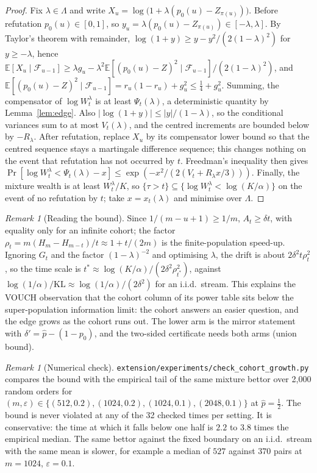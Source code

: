 \documentclass[11pt]{article}
\theoremstyle{definition}
\theoremstyle{remark}
\newtheorem{remark}[theorem]{Remark}
\newcommand{\eps}{\varepsilon}
\newcommand{\E}{\mathbb{E}}
\newcommand{\F}{\mathcal{F}}
\begin{document}
\begin{proof}
Fix $\lambda\in\Lambda$ and write
$X_u=\log\bigl(1+\lambda(p_0(u)-Z_{\pi(u)})\bigr)$. Before refutation
$p_0(u)\in[0,1]$, so $y_u=\lambda(p_0(u)-Z_{\pi(u)})\in[-\lambda,\lambda]$. By
Taylor's theorem with remainder, $\log(1+y)\ge y-y^2/(2(1-\lambda)^2)$ for
$y\ge-\lambda$, hence
$\E[X_u\mid\F_{u-1}]\ge\lambda g_u-\lambda^2\E[(p_0(u)-Z)^2\mid\F_{u-1}]/(2(1-\lambda)^2)$,
and $\E[(p_0(u)-Z)^2\mid\F_{u-1}]=r_u(1-r_u)+g_u^2\le\frac14+g_u^2$. Summing, the
compensator of $\log W^\lambda_t$ is at least $\Psi_t(\lambda)$, a deterministic
quantity by Lemma~\ref{lem:edge}. Also $|\log(1+y)|\le|y|/(1-\lambda)$, so the
conditional variances sum to at most $V_t(\lambda)$, and the centred increments are
bounded below by $-R_\lambda$. After refutation, replace $X_u$ by its compensator
lower bound so that the centred sequence stays a martingale difference sequence;
this changes nothing on the event that refutation has not occurred by $t$. Freedman's
inequality then gives
$\Pr[\log W^\lambda_t<\Psi_t(\lambda)-x]\le\exp(-x^2/(2(V_t+R_\lambda x/3)))$.
Finally, the mixture wealth is at least $W^\lambda_t/K$, so
$\{\tau>t\}\subseteq\{\log W^\lambda_t<\log(K/\alpha)\}$ on the event of no
refutation by $t$; take $x=x_t(\lambda)$ and minimise over $\Lambda$.
\end{proof}

\begin{remark}[Reading the bound]
Since $1/(m-u+1)\ge1/m$, $A_t\ge\delta t$, with equality only for an infinite cohort;
the factor $\rho_t=m(H_m-H_{m-t})/t\approx1+t/(2m)$ is the finite-population
speed-up. Ignoring $G_t$ and the factor $(1-\lambda)^{-2}$ and optimising $\lambda$,
the drift is about $2\delta^2t\rho_t^2$, so the time scale is
$t^\ast\approx\log(K/\alpha)/(2\delta^2\rho_{t^\ast}^2)$, against
$\log(1/\alpha)/\mathrm{KL}\approx\log(1/\alpha)/(2\delta^2)$ for an i.i.d.\ stream.
This explains the VOUCH observation that the cohort column of its power table sits
below the super-population information limit: the cohort answers an easier question,
and the edge grows as the cohort runs out. The lower arm is the mirror statement with
$\delta'=\hat p-(1-p_0)$, and the two-sided certificate needs both arms (union bound).
\end{remark}

\begin{remark}[Numerical check]
\texttt{extension/experiments/check\_cohort\_growth.py} compares the bound with the
empirical tail of the same mixture bettor over 2{,}000 random orders for
$(m,\eps)\in\{(512,0.2),(1024,0.2),(1024,0.1),(2048,0.1)\}$ at $\hat p=\frac12$. The
bound is never violated at any of the 32 checked times per setting. It is
conservative: the time at which it falls below one half is $2.2$ to $3.8$ times the
empirical median. The same bettor against the fixed boundary on an i.i.d.\ stream
with the same mean is slower, for example a median of $527$ against $370$ pairs at
$m=1024$, $\eps=0.1$.
\end{remark}
\end{document}
